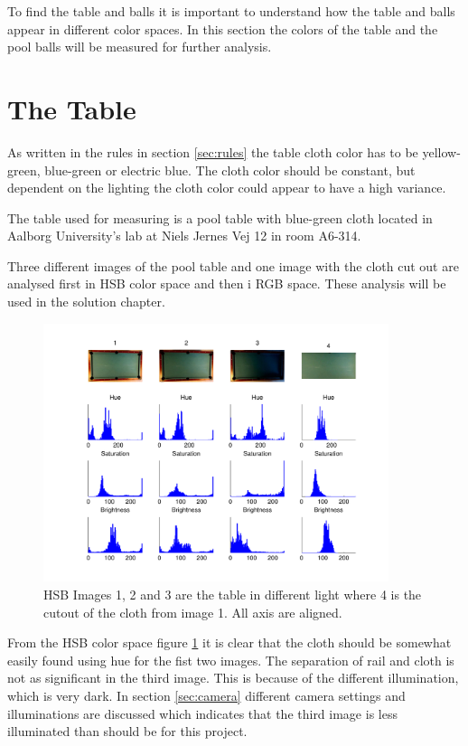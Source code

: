 To find the table and balls it is important to understand how the table and balls appear in different color spaces. In this section the colors of the table and the pool balls will be measured for further analysis.

\section{The Table}
As written in the rules in section \ref{sec:rules} the table cloth color has to be yellow-green, blue-green or electric blue. The cloth color should be constant, but dependent on the lighting the cloth color could appear to have a high variance.

The table used for measuring is a pool table with blue-green cloth located in Aalborg University's lab at Niels Jernes Vej 12 in room A6-314.

Three different images of the pool table and one image with the cloth cut out are analysed first in HSB color space and then i RGB space. These analysis will be used in the solution chapter.

\begin{figure}[H]
\begin{center}
\leavevmode
\includegraphics[width=0.9\textwidth]{images/hsv_hist_table}
\end{center}
\caption{HSB Images 1, 2 and 3 are the table in different light where 4 is the cutout of the cloth from image 1. All axis are aligned.}
\label{fig:tablehsv}
\end{figure} 

From the HSB color space figure \ref{fig:tablehsv} it is clear that the cloth should be somewhat easily found using hue for the fist two images. The separation of rail and cloth is not as significant in the third image. This is because of the different illumination, which is very dark. In section \ref{sec:camera} different camera settings and illuminations are discussed which indicates that the third image is less illuminated than should be for this project.

